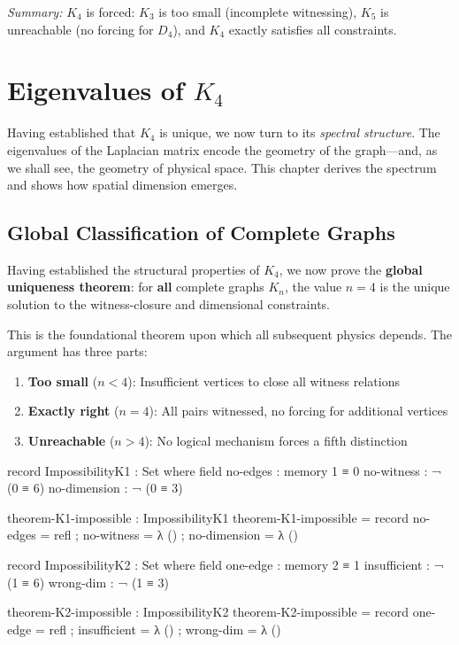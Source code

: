 \documentclass[11pt,a4paper]{book}
\begin{document}
\medskip
\noindent\textit{Summary:} $K_4$ is forced: $K_3$ is too small (incomplete witnessing), 
$K_5$ is unreachable (no forcing for $D_4$), and $K_4$ exactly satisfies all constraints.

\chapter[Eigenvalues of K4]{Eigenvalues of $K_4$}
\label{chap:spectral-theory}

Having established that $K_4$ is unique, we now turn to its \emph{spectral structure}. 
The eigenvalues of the Laplacian matrix encode the geometry of the graph—and, as we shall 
see, the geometry of physical space. This chapter derives the spectrum and shows how 
spatial dimension emerges.

\section{Global Classification of Complete Graphs}
\label{sec:global-classification}

Having established the structural properties of $K_4$, we now prove the \textbf{global uniqueness theorem}: for \textbf{all} complete graphs $K_n$, the value $n = 4$ is the unique solution to the witness-closure and dimensional constraints.

This is the foundational theorem upon which all subsequent physics depends. The argument has three parts:
\begin{enumerate}
\item \textbf{Too small} ($n < 4$): Insufficient vertices to close all witness relations
\item \textbf{Exactly right} ($n = 4$): All pairs witnessed, no forcing for additional vertices
\item \textbf{Unreachable} ($n > 4$): No logical mechanism forces a fifth distinction
\end{enumerate}

\begin{code}
record ImpossibilityK1 : Set where
  field
    no-edges      : memory 1 ≡ 0
    no-witness    : ¬ (0 ≡ 6)
    no-dimension  : ¬ (0 ≡ 3)

theorem-K1-impossible : ImpossibilityK1
theorem-K1-impossible = record
  { no-edges     = refl
  ; no-witness   = λ ()
  ; no-dimension = λ ()
  }

record ImpossibilityK2 : Set where
  field
    one-edge      : memory 2 ≡ 1
    insufficient  : ¬ (1 ≡ 6)
    wrong-dim     : ¬ (1 ≡ 3)

theorem-K2-impossible : ImpossibilityK2
theorem-K2-impossible = record
  { one-edge     = refl
  ; insufficient = λ ()
  ; wrong-dim    = λ ()
  }
\end{code}
\end{document}
